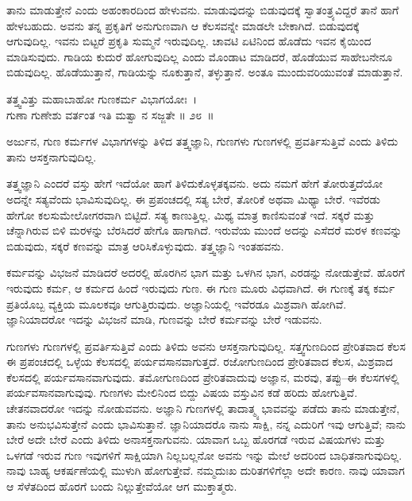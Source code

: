 ತಾನು ಮಾಡುತ್ತೇನೆ ಎಂದು ಅಹಂಕಾರದಿಂದ ಹೇಳುವನು. ಮಾಡುವುದನ್ನು ಬಿಡುವುದಕ್ಕೆ ಸ್ವಾತಂತ್ರ್ಯವಿದ್ದರೆ ತಾನೆ ಹಾಗೆ ಹೇಳಬಹುದು. ಅವನು ತನ್ನ ಪ್ರಕೃತಿಗೆ ಅನುಗುಣವಾಗಿ ಆ ಕೆಲಸವನ್ನೇ ಮಾಡಲೇ ಬೇಕಾಗಿದೆ. ಬಿಡುವುದಕ್ಕೆ ಆಗುವುದಿಲ್ಲ. ಇವನು ಬಿಟ್ಟರೆ ಪ್ರಕೃತಿ ಸುಮ್ಮನೆ ಇರುವುದಿಲ್ಲ. ಚಾವಟಿ ಏಟಿನಿಂದ ಹೊಡೆದು ಇವನ ಕೈಯಿಂದ ಮಾಡಿಸುವುದು. ಗಾಡಿಯ ಕುದುರೆ ಹೋಗುವುದಿಲ್ಲ ಎಂದು ಮೊಂಡಾಟ ಮಾಡಿದರೆ, ಹೊಡೆಯುವ ಸಾಹೇಬನೇನೂ ಬಿಡುವುದಿಲ್ಲ. ಹೊಡೆಯುತ್ತಾನೆ, ಗಾಡಿಯನ್ನು ನೂಕುತ್ತಾನೆ, ತಳ್ಳುತ್ತಾನೆ. ಅಂತೂ ಮುಂದುವರಿಯುವಂತೆ ಮಾಡುತ್ತಾನೆ.

\begin{shloka}
ತತ್ತ್ವವಿತ್ತು ಮಹಾಬಾಹೋ ಗುಣಕರ್ಮ ವಿಭಾಗಯೋಃ~।\\ಗುಣಾ ಗುಣೇಶು ವರ್ತಂತ ಇತಿ ಮತ್ವಾ ನ ಸಜ್ಜತೇ \hfill॥ ೨೮~॥
\end{shloka}

\begin{artha}
ಅರ್ಜುನ, ಗುಣ ಕರ್ಮಗಳ ವಿಭಾಗಗಳನ್ನು ತಿಳಿದ ತತ್ತ್ವಜ್ಞಾನಿ, ಗುಣಗಳು ಗುಣಗಳಲ್ಲಿ ಪ್ರವರ್ತಿ\-ಸುತ್ತಿವೆ ಎಂದು ತಿಳಿದು ತಾನು ಆಸಕ್ತನಾಗುವುದಿಲ್ಲ.
\end{artha}

ತತ್ತ್ವಜ್ಞಾನಿ ಎಂದರೆ ವಸ್ತು ಹೇಗೆ ಇದೆಯೋ ಹಾಗೆ ತಿಳಿದುಕೊಳ್ಳತಕ್ಕವನು. ಅದು ನಮಗೆ ಹೇಗೆ ತೋರುತ್ತದೆಯೋ ಅದನ್ನೇ ಸತ್ಯವೆಂದು ಭಾವಿಸುವುದಿಲ್ಲ. ಈ ಪ್ರಪಂಚದಲ್ಲಿ ಸತ್ಯ ಬೇರೆ, ತೋರಿಕೆ ಅಥವಾ ಮಿಥ್ಯಾ ಬೇರೆ. ಇವೆರಡು ಹೇಗೋ ಕಲಸುಮೇಲೋಗರವಾಗಿ ಬಿಟ್ಟಿದೆ. ಸತ್ಯ ಕಾಣುತ್ತಿಲ್ಲ. ಮಿಥ್ಯ ಮಾತ್ರ ಕಾಣಿಸುವಂತೆ ಇದೆ. ಸಕ್ಕರೆ ಮತ್ತು ಚೆನ್ನಾಗಿರುವ ಬಿಳಿ ಮರಳನ್ನು ಬೆರಸಿದರೆ ಹೇಗೊ ಹಾಗಾಗಿದೆ. ಇರುವೆಯ ಮುಂದೆ ಅದನ್ನು ಎಸೆದರೆ ಮರಳ ಕಣವನ್ನು ಬಿಡುವುದು, ಸಕ್ಕರೆ ಕಣವನ್ನು ಮಾತ್ರ ಆರಿಸಿಕೊಳ್ಳುವುದು. ತತ್ತ್ವಜ್ಞಾನಿ ಇಂತಹವನು.

ಕರ್ಮವನ್ನು ವಿಭಜನೆ ಮಾಡಿದರೆ ಅದರಲ್ಲಿ ಹೊರಗಿನ ಭಾಗ ಮತ್ತು ಒಳಗಿನ ಭಾಗ, ಎರಡನ್ನು ನೋಡುತ್ತೇವೆ. ಹೊರಗೆ ಇರುವುದು ಕರ್ಮ, ಆ ಕರ್ಮದ ಹಿಂದೆ ಇರುವುದು ಗುಣ. ಈ ಗುಣ ಮೂರು ವಿಧವಾಗಿದೆ. ಈ ಗುಣಕ್ಕೆ ತಕ್ಕ ಕರ್ಮ ಪ್ರತಿಯೊಬ್ಬ ವ್ಯಕ್ತಿಯ ಮೂಲಕವೂ ಆಗುತ್ತಿರುವುದು. ಅಜ್ಞಾನಿಯಲ್ಲಿ ಇವೆರಡೂ ಮಿಶ್ರವಾಗಿ ಹೋಗಿವೆ. ಜ್ಞಾನಿಯಾದರೋ ಇದನ್ನು ವಿಭಜನೆ ಮಾಡಿ, ಗುಣವನ್ನು ಬೇರೆ ಕರ್ಮವನ್ನು ಬೇರೆ ಇಡುವನು.

ಗುಣಗಳು ಗುಣಗಳಲ್ಲಿ ಪ್ರವರ್ತಿಸುತ್ತಿವೆ ಎಂದು ತಿಳಿದು ಅವನು ಆಸಕ್ತನಾಗುವುದಿಲ್ಲ. ಸತ್ತ್ವಗುಣದಿಂದ ಪ್ರೇರಿತವಾದ ಕೆಲಸ ಈ ಪ್ರಪಂಚದಲ್ಲಿ ಒಳ್ಳೆಯ ಕೆಲಸದಲ್ಲಿ ಪರ್ಯವಸಾನವಾಗುತ್ತದೆ. ರಜೋಗುಣದಿಂದ ಪ್ರೇರಿತವಾದ ಕೆಲಸ, ಮಿಶ್ರವಾದ ಕೆಲಸದಲ್ಲಿ ಪರ್ಯವಸಾನವಾಗುವುದು. ತಮೋಗುಣದಿಂದ ಪ್ರೇರಿತವಾದುವು ಅಜ್ಞಾನ, ಮರವು, ತಪ್ಪು–ಈ ಕೆಲಸಗಳಲ್ಲಿ ಪರ್ಯವಸಾನವಾಗುವುವು. ಗುಣಗಳು ಮೇಲಿನಿಂದ ಬಿದ್ದು ವಿಷಯ ವಸ್ತುವಿನ ಕಡೆ ಹರಿದು ಹೋಗುತ್ತಿವೆ. ಚೇತನವಾದರೋ ಇದನ್ನು ನೋಡುವವನು. ಅಜ್ಞಾನಿ ಗುಣಗಳಲ್ಲಿ ತಾದಾತ್ಮ್ಯ ಭಾವವನ್ನು ಪಡೆದು ತಾನು ಮಾಡುತ್ತೇನೆ, ತಾನು ಅನುಭವಿಸುತ್ತೇನೆ ಎಂದು ಭಾವಿಸುತ್ತಾನೆ. ಜ್ಞಾನಿಯಾದರೊ ನಾನು ಸಾಕ್ಷಿ, ನನ್ನ ಎದುರಿಗೆ ಇವು ಆಗುತ್ತಿವೆ; ನಾನು ಬೇರೆ ಅದೇ ಬೇರೆ ಎಂದು ತಿಳಿದು ಅನಾಸಕ್ತನಾಗುವನು. ಯಾವಾಗ ಒಬ್ಬ ಹೊರಗಡೆ ಇರುವ ವಿಷಯಗಳು ಮತ್ತು ಒಳಗಡೆ ಇರುವ ಗುಣ ಇವುಗಳಿಗೆ ಸಾಕ್ಷಿಯಾಗಿ ನಿಲ್ಲಬಲ್ಲನೋ ಅವನು ಇನ್ನು ಮೇಲೆ ಅದರಿಂದ ಬಾಧಿತನಾಗುವುದಿಲ್ಲ. ನಾವು ಬಾಹ್ಯ ಆಕರ್ಷಣೆಯಲ್ಲಿ ಮುಳುಗಿ ಹೋಗುತ್ತೇವೆ. ನಮ್ಮದುಃಖ ದುರಿತಗಳಿಗೆಲ್ಲಾ ಅದೇ ಕಾರಣ. ನಾವು ಯಾವಾಗ ಆ ಸೆಳೆತದಿಂದ ಹೊರಗೆ ಬಂದು ನಿಲ್ಲುತ್ತೇವೆಯೋ ಆಗ ಮುಕ್ತಾತ್ಮರು.

